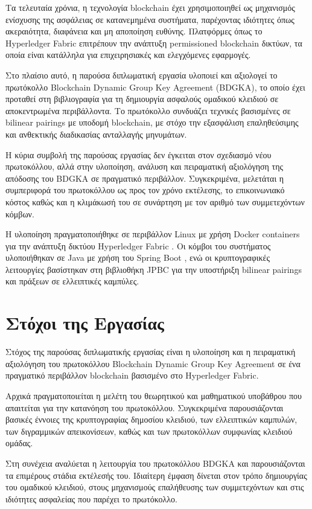 \documentclass[12pt,a4paper]{report}
\begin{document}
Τα τελευταία χρόνια, η τεχνολογία blockchain έχει χρησιμοποιηθεί ως μηχανισμός ενίσχυσης της ασφάλειας σε κατανεμημένα συστήματα, παρέχοντας ιδιότητες όπως ακεραιότητα, διαφάνεια και μη αποποίηση ευθύνης. Πλατφόρμες όπως το Hyperledger Fabric επιτρέπουν την ανάπτυξη permissioned blockchain δικτύων, τα οποία είναι κατάλληλα για επιχειρησιακές και ελεγχόμενες εφαρμογές.

Στο πλαίσιο αυτό, η παρούσα διπλωματική εργασία υλοποιεί και αξιολογεί το πρωτόκολλο Blockchain Dynamic Group Key Agreement (BDGKA), το οποίο έχει προταθεί στη βιβλιογραφία για τη δημιουργία ασφαλούς ομαδικού κλειδιού σε αποκεντρωμένα περιβάλλοντα. Το πρωτόκολλο συνδυάζει τεχνικές βασισμένες σε bilinear pairings με υποδομή blockchain, με στόχο την εξασφάλιση επαληθεύσιμης και ανθεκτικής διαδικασίας ανταλλαγής μηνυμάτων.

Η κύρια συμβολή της παρούσας εργασίας δεν έγκειται στον σχεδιασμό νέου πρωτοκόλλου, αλλά στην υλοποίηση, ανάλυση και πειραματική αξιολόγηση της απόδοσης του BDGKA σε πραγματικό περιβάλλον. Συγκεκριμένα, μελετάται η συμπεριφορά του πρωτοκόλλου ως προς τον χρόνο εκτέλεσης, το επικοινωνιακό κόστος  καθώς και η κλιμάκωσή του σε συνάρτηση με τον αριθμό των συμμετεχόντων κόμβων.

Η υλοποίηση πραγματοποιήθηκε σε περιβάλλον Linux με χρήση Docker containers για την ανάπτυξη δικτύου Hyperledger Fabric . Οι κόμβοι του συστήματος υλοποιήθηκαν σε Java με χρήση του Spring Boot , ενώ οι κρυπτογραφικές λειτουργίες βασίστηκαν στη βιβλιοθήκη JPBC για την υποστήριξη bilinear pairings και πράξεων σε ελλειπτικές καμπύλες.


\section{Στόχοι της Εργασίας}

Στόχος της παρούσας διπλωματικής εργασίας είναι η υλοποίηση και η πειραματική αξιολόγηση του πρωτοκόλλου Blockchain Dynamic Group Key Agreement σε ένα πραγματικό περιβάλλον blockchain βασισμένο στο Hyperledger Fabric.

Αρχικά πραγματοποιείται η μελέτη του θεωρητικού και μαθηματικού υποβάθρου που απαιτείται για την κατανόηση του πρωτοκόλλου. Συγκεκριμένα παρουσιάζονται βασικές έννοιες της κρυπτογραφίας δημοσίου κλειδιού, των ελλειπτικών καμπυλών, των διγραμμικών απεικονίσεων, καθώς και των πρωτοκόλλων συμφωνίας κλειδιού ομάδας.

Στη συνέχεια αναλύεται η λειτουργία του πρωτοκόλλου BDGKA και παρουσιάζονται τα επιμέρους στάδια εκτέλεσής του. Ιδιαίτερη έμφαση δίνεται στον τρόπο δημιουργίας του ομαδικού κλειδιού, στους μηχανισμούς επαλήθευσης των συμμετεχόντων και στις ιδιότητες ασφαλείας που παρέχει το πρωτόκολλο.
\end{document}
